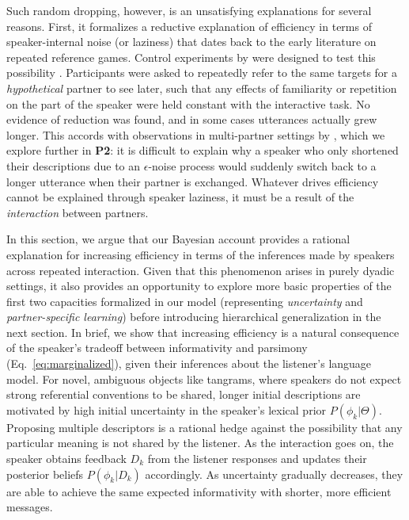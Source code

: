 Such random dropping, however, is an unsatisfying explanations for several reasons.
First, it formalizes a reductive explanation of efficiency in terms of speaker-internal noise (or laziness) that dates back to the early literature on repeated reference games.
Control experiments by  were designed to test this possibility \cite<see also>{GarrodFayLeeOberlanderMacLeod07_GraphicalSymbolSystems}. 
Participants were asked to repeatedly refer to the same targets for a \emph{hypothetical} partner to see later, such that any effects of familiarity or repetition on the part of the speaker were held constant with the interactive task. 
No evidence of reduction was found, and in some cases utterances actually grew longer.
This accords with observations in multi-partner settings by , which we explore further in \textbf{P2}: it is difficult to explain why a speaker who only shortened their descriptions due to an $\epsilon$-noise process would suddenly switch back to a longer utterance when their partner is exchanged.
Whatever drives efficiency cannot be explained through speaker laziness, it must be a result of the \emph{interaction} between partners.

In this section, we argue that our Bayesian account provides a rational explanation for increasing efficiency in terms of the inferences made by speakers across repeated interaction.
Given that this phenomenon arises in purely dyadic settings, it also provides an opportunity to explore more basic properties of the first two capacities formalized in our model (representing \emph{uncertainty} and \emph{partner-specific learning}) before introducing hierarchical generalization in the next section. 
In brief, we show that increasing efficiency is a natural consequence of the speaker's tradeoff between informativity and parsimony (Eq.~\ref{eq:marginalized}), given their inferences about the listener's language model. 
For novel, ambiguous objects like tangrams, where speakers do not expect strong referential conventions to be shared, longer initial descriptions are motivated by high initial uncertainty in the speaker's lexical prior $P(\phi_k | \Theta)$. 
Proposing multiple descriptors is a rational hedge against the possibility that any particular meaning is not shared by the listener.
As the interaction goes on, the speaker obtains feedback $D_k$ from the listener responses and updates their posterior beliefs $P(\phi_k | D_k)$ accordingly. 
As uncertainty gradually decreases, they are able to achieve the same expected informativity with shorter, more efficient messages. 

